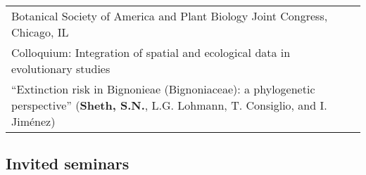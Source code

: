\documentclass[11pt,english]{article}
\providecommand{\tabularnewline}{\\}
\begin{document}
\begin{tabularx}{\textwidth}{@{}>{\raggedright}p{5.25in} >{\raggedleft}X@{}}
Botanical Society of America and Plant Biology Joint Congress, Chicago, IL & 2007 \tabularnewline
\addtolength{\leftskip}{5ex} \small{Colloquium: Integration of spatial and ecological data in evolutionary studies} \tabularnewline
\addtolength{\leftskip}{5ex} ``Extinction risk in Bignonieae (Bignoniaceae): a phylogenetic perspective'' (\textbf{Sheth, S.N.}, L.G. Lohmann, T. Consiglio, and I. Jim\'enez) \tabularnewline

\end{tabularx}
\vspace{-0.5ex}

\subsection*{Invited seminars}
\vspace{-1ex}
\end{document}
